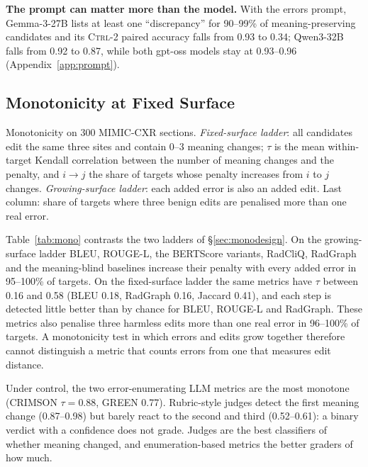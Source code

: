 \documentclass[11pt]{article}
\newcommand{\ctrlt}{\textsc{Ctrl-2}\xspace}
\begin{document}
\textbf{The prompt can matter more than the model.} With the errors prompt, Gemma-3-27B lists at least one ``discrepancy'' for 90--99\% of meaning-preserving candidates and its \ctrlt paired accuracy falls from 0.93 to 0.34; Qwen3-32B falls from 0.92 to 0.87, while both gpt-oss models stay at 0.93--0.96 (Appendix~\ref{app:prompt}).

\subsection{Monotonicity at Fixed Surface}

\begin{table}[t]
\centering
\scriptsize
\setlength{\tabcolsep}{2.5pt}
\begin{adjustbox}{max width=\columnwidth}

\end{adjustbox}
\caption{Monotonicity on 300 MIMIC-CXR sections. \emph{Fixed-surface ladder}: all candidates edit the same three sites and contain 0--3 meaning changes; $\tau$ is the mean within-target Kendall correlation between the number of meaning changes and the penalty, and $i{\to}j$ the share of targets whose penalty increases from $i$ to $j$ changes. \emph{Growing-surface ladder}: each added error is also an added edit. Last column: share of targets where three benign edits are penalised more than one real error.}
\label{tab:mono}
\end{table}

Table~\ref{tab:mono} contrasts the two ladders of \S\ref{sec:monodesign}. On the growing-surface ladder BLEU, ROUGE-L, the BERTScore variants, RadCliQ, RadGraph and the meaning-blind baselines increase their penalty with every added error in 95--100\% of targets. On the fixed-surface ladder the same metrics have $\tau$ between 0.16 and 0.58 (BLEU 0.18, RadGraph 0.16, Jaccard 0.41), and each step is detected little better than by chance for BLEU, ROUGE-L and RadGraph. These metrics also penalise three harmless edits more than one real error in 96--100\% of targets. A monotonicity test in which errors and edits grow together therefore cannot distinguish a metric that counts errors from one that measures edit distance.

Under control, the two error-enumerating LLM metrics are the most monotone (CRIMSON $\tau{=}0.88$, GREEN 0.77). Rubric-style judges detect the first meaning change (0.87--0.98) but barely react to the second and third (0.52--0.61): a binary verdict with a confidence does not grade. Judges are the best classifiers of whether meaning changed, and enumeration-based metrics the better graders of how much.
\end{document}

